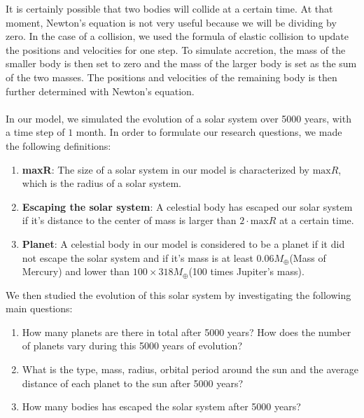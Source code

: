 It is certainly possible that two bodies will collide at a certain time. At that moment, Newton's equation is not very useful because we will be dividing by zero. In the case of a collision, we used the formula of elastic collision to update the positions and velocities for one step. To simulate accretion, the mass of the smaller body is then set to zero and the mass of the larger body is set as the sum of the two masses. The positions and velocities of the remaining body is then further determined with Newton's equation.\\
\\
In our model, we simulated the evolution of a solar system over 5000 years, with a time step of $1$ month. In order to formulate our research questions, we made the following definitions:\\
\begin{enumerate}
\item \textbf{maxR}: The size of a solar system in our model is characterized by $\text{max}R$, which is the radius of a solar system. 
\item \textbf{Escaping the solar system}: A celestial body has escaped our solar system if it's distance to the center of mass is larger than $2\cdot\text{max}R$ at a certain time.
\item \textbf{Planet}: A celestial body in our model is considered to be a planet if it did not escape the solar system and if it's mass is at least  0.06$M_{\oplus}$(Mass of Mercury) and lower than $100\times 318M_{\oplus}$(100 times Jupiter's mass).
\end{enumerate}
We then studied the evolution of this solar system by investigating the following main questions:
\begin{enumerate}
	\item  How many planets are there in total after 5000 years? How does the number of planets vary during this 5000 years of evolution?

	\item What is the type, mass, radius, orbital period around the sun and the average distance of each planet to the sun after 5000 years?

	\item How many bodies has escaped the solar system after 5000 years?
\end{enumerate}
 